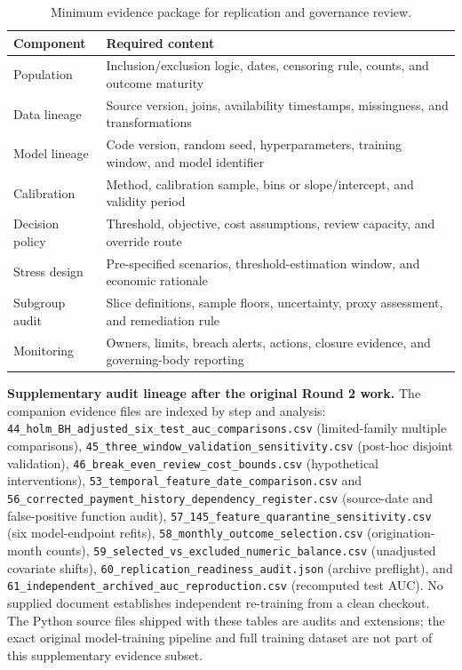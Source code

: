\documentclass[10pt]{article}
\begin{document}
\begin{table}[!ht]
\centering
\caption{Minimum evidence package for replication and governance review.}
\label{tab:audit_package}
\begin{tabular}{L{3.5cm}L{10.5cm}}
\toprule
Component & Required content \\
\midrule
Population & Inclusion/exclusion logic, dates, censoring rule, counts, and outcome maturity \\
Data lineage & Source version, joins, availability timestamps, missingness, and transformations \\
Model lineage & Code version, random seed, hyperparameters, training window, and model identifier \\
Calibration & Method, calibration sample, bins or slope/intercept, and validity period \\
Decision policy & Threshold, objective, cost assumptions, review capacity, and override route \\
Stress design & Pre-specified scenarios, threshold-estimation window, and economic rationale \\
Subgroup audit & Slice definitions, sample floors, uncertainty, proxy assessment, and remediation rule \\
Monitoring & Owners, limits, breach alerts, actions, closure evidence, and governing-body reporting \\
\bottomrule
\end{tabular}
\end{table}





\noindent\textbf{Supplementary audit lineage after the original Round 2 work.} The companion evidence files are indexed by step and analysis: \texttt{44\_holm\_BH\_adjusted\_six\_test\_auc\_comparisons.csv} (limited-family multiple comparisons), \texttt{45\_three\_window\_validation\_sensitivity.csv} (post-hoc disjoint validation), \texttt{46\_break\_even\_review\_cost\_bounds.csv} (hypothetical interventions), \texttt{53\_temporal\_feature\_date\_comparison.csv} and \texttt{56\_corrected\_payment\_history\_dependency\_register.csv} (source-date and false-positive function audit), \texttt{57\_145\_feature\_quarantine\_sensitivity.csv} (six model-endpoint refits), \texttt{58\_monthly\_outcome\_selection.csv} (origination-month counts), \texttt{59\_selected\_vs\_excluded\_numeric\_balance.csv} (unadjusted covariate shifts), \texttt{60\_replication\_readiness\_audit.json} (archive preflight), and \texttt{61\_independent\_archived\_auc\_reproduction.csv} (recomputed test AUC). No supplied document establishes independent re-training from a clean checkout. The Python source files shipped with these tables are audits and extensions; the exact original model-training pipeline and full training dataset are not part of this supplementary evidence subset.
\end{document}
